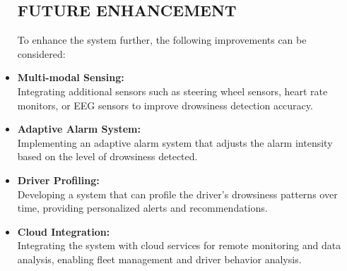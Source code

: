 \documentclass[12pt]{article}
\begin{document}
\begin{itemize}
\subsection{FUTURE ENHANCEMENT }
To enhance the system further, the following improvements can be considered:
\item \textbf{Multi-modal Sensing:}\\
Integrating additional sensors such as steering wheel sensors, heart rate monitors, or EEG sensors to improve drowsiness detection accuracy.
\item \textbf{Adaptive Alarm System:}\\
Implementing an adaptive alarm system that adjusts the alarm intensity based on the level of drowsiness detected.
\item \textbf{Driver Profiling: }\\
Developing a system that can profile the driver's drowsiness patterns over time, providing personalized alerts and recommendations.
\item \textbf{Cloud Integration: }\\
Integrating the system with cloud services for remote monitoring and data analysis, enabling fleet management and driver behavior analysis.

\end{itemize}
\end{document}
